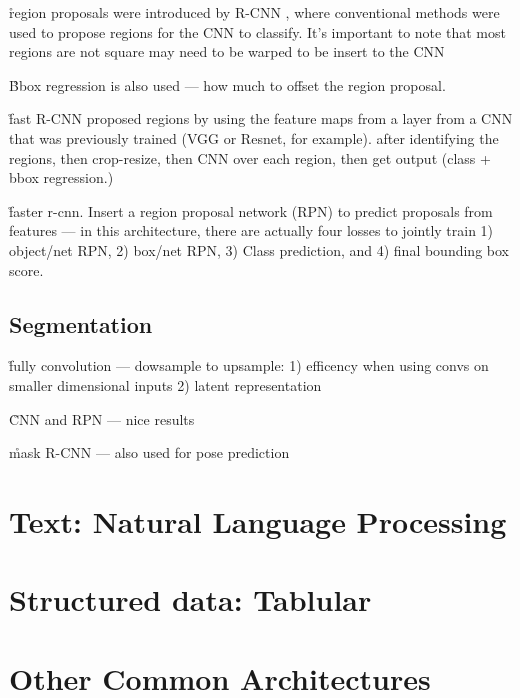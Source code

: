 \r{region proposals were introduced by R-CNN , where conventional methods were used to propose regions for the CNN to classify. It's important to note that most regions are not square may need to be warped to be insert to the CNN}

\r{Bbox regression is also used --- how much to offset the region proposal.}


\r{fast R-CNN proposed regions by using the feature maps from a layer from a CNN that was previously trained (VGG or Resnet, for example). after identifying the regions, then crop-resize, then CNN over each region, then get output (class + bbox regression.)}

\r{faster r-cnn. Insert a region proposal network (RPN) to predict proposals from features --- in this architecture, there are actually four losses to jointly train 1) object/net RPN, 2) box/net RPN, 3) Class prediction, and 4) final bounding box score.}


\subsection{Segmentation}

\r{fully convolution --- dowsample to upsample: 1) efficency when using convs on smaller dimensional inputs 2) latent representation}

\r{CNN and RPN --- nice results }

\r{mask R-CNN --- also used for pose prediction}



\section{Text: Natural Language Processing}


\section{Structured data: Tablular}


\section{Other Common Architectures}

